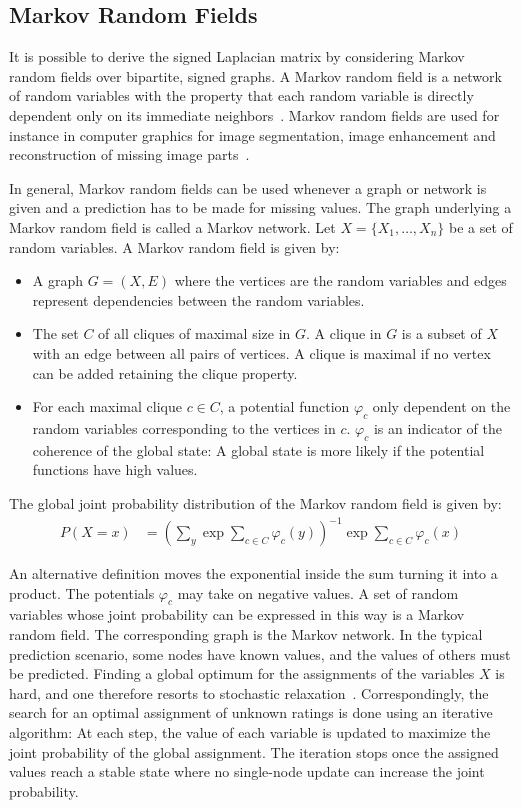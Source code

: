 \documentclass[11pt,a4paper]{book}
\begin{document}
\subsection{Markov Random Fields}
It is possible to derive the signed Laplacian matrix by
considering Markov random fields over bipartite, signed graphs. 
A Markov random field is a network of random variables with the property that
each random variable is directly dependent only on its immediate neighbors~\cite{b96,b95}.
Markov random fields are used for instance in computer graphics for image segmentation, image
enhancement and reconstruction of missing image parts~\cite{b89}.  

In general, Markov random fields can be used whenever a graph or network
is given and a prediction has to be made for missing values.  The graph 
underlying a Markov random field is called a Markov network. 
Let $X= \{X_1, \ldots, X_n\}$ be a set of random variables.
A Markov random field is given by: 
\begin{itemize}
\item A graph $G=(X, E)$ where the vertices are the random variables and
  edges represent dependencies between the random variables. 
\item The set $C$ of all cliques of maximal size in $G$.
  A clique in $G$ is a subset of
  $X$ with an edge between all pairs of vertices.  A clique is maximal if no
  vertex can be added retaining the clique property. 
\item For each maximal clique $c \in C$, a potential function $\varphi_c$ only
  dependent on the random variables corresponding to the vertices in $c$.  
  $\varphi_c$ is an indicator of the coherence of the global state:
  A global state is more likely if the potential functions have high values.  
\end{itemize}
The global joint probability distribution of the Markov random field is 
given by: 
\begin{align}
  P(X = x) &= \left( \sum_y \exp \sum_{c\in C} \varphi_c(y)\right)^{-1}
  \exp \sum_{c\in C} \varphi_c(x)
\end{align}

An alternative definition moves the exponential inside the sum turning
it into a product.  The potentials $\varphi_c$ may take on negative
values.  A set of random variables whose joint probability can be
expressed in this way is a Markov random field.  The corresponding graph
is the Markov network.  In the typical prediction scenario, some nodes
have known values, and the values of others must be predicted.  Finding
a global optimum for the assignments of the variables $X$ is hard, and
one therefore resorts to stochastic relaxation~\cite{b96,b95}.
Correspondingly, the search for an optimal assignment of unknown ratings
is done using an iterative algorithm: At each step, the value of each
variable is updated to maximize the joint probability of the global
assignment.  The iteration stops once the assigned values reach a stable
state where no single-node update can increase the joint probability.
\end{document}
